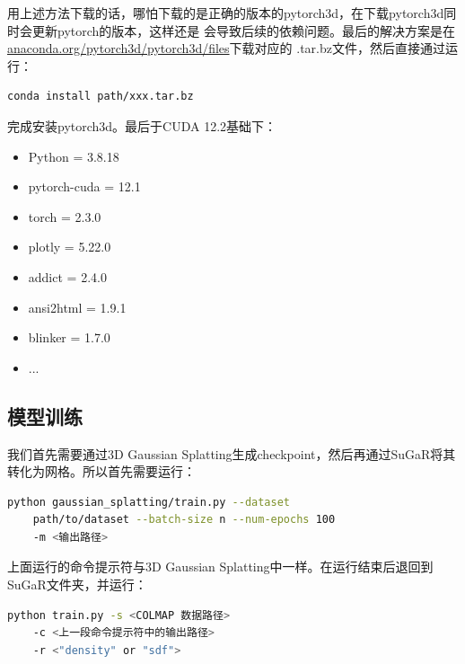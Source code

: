 \documentclass{nwputhesis}
\begin{document}
\indent
用上述方法下载的话，哪怕下载的是正确的版本的pytorch3d，在下载pytorch3d同时会更新pytorch的版本，这样还是
会导致后续的依赖问题。最后的解决方案是在\underline{anaconda.org/pytorch3d/pytorch3d/files}下载对应的
.tar.bz文件，然后直接通过运行：
\begin{lstlisting}[language=bash]
    conda install path/xxx.tar.bz
\end{lstlisting}
完成安装pytorch3d。最后于CUDA 12.2基础下：
\begin{itemize}
    \item Python = 3.8.18
    \item pytorch-cuda = 12.1
    \item torch = 2.3.0
    \item plotly = 5.22.0
    \item addict = 2.4.0
    \item ansi2html = 1.9.1
    \item blinker = 1.7.0
    \item ...
\end{itemize}
\subsection{模型训练}
\indent
我们首先需要通过3D Gaussian Splatting生成checkpoint，然后再通过SuGaR将其转化为网格。所以首先需要运行：
\begin{lstlisting}[language=bash]
    python gaussian_splatting/train.py --dataset 
    path/to/dataset --batch-size n --num-epochs 100 
    -m <输出路径>
\end{lstlisting}

\indent
上面运行的命令提示符与3D Gaussian Splatting中一样。在运行结束后退回到SuGaR文件夹，并运行：
\begin{lstlisting}[language=bash]
    python train.py -s <COLMAP 数据路径> 
    -c <上一段命令提示符中的输出路径> 
    -r <"density" or "sdf">
\end{lstlisting}
\end{document}
